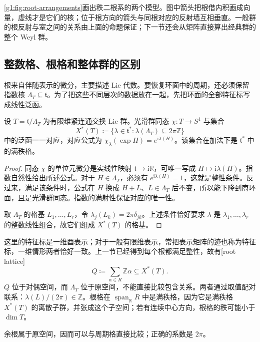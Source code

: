 \cref{g1:fig:root-arrangements}画出秩二根系的两个模型。图中箭头把根借内积画成向量，虚线才是它们的核；位于根方向的箭头与同根对应的反射墙互相垂直。一般群的根反射与室之间的关系由上面的命题保证；下一节还会从矩阵直接算出经典群的整个 Weyl 群。

\subsection{整数格、根格和整体群的区别}
\label{g1:subsec:1904:04}
根来自伴随表示的微分，主要描述 Lie 代数。要恢复环面中的周期，还必须保留指数核
\(\Lambda_T\subseteq\mathfrak t\)。为了把这些不同层次的数据放在一起，先把环面的全部特征标写成线性泛函。

\begin{proposition}\label{g1:prop:torus-character-lattice}
	设 \(T=\mathfrak t/\Lambda_T\) 为有限维紧连通交换 Lie 群。光滑群同态 \(\chi:T\to S^1\) 与集合
	\[
		X^*(T)\coloneqq\{\lambda\in\mathfrak t^*:
		\lambda(\Lambda_T)\subseteq2\pi\mathbb Z\}
	\]
	中的泛函一一对应，对应公式为 \(\chi_\lambda(\exp H)=e^{\mathrm{i}\lambda(H)}\)。该集合在加法下是 \(\mathfrak t^*\) 中的满秩格。
\end{proposition}
\begin{proof}
	同态 \(\chi\) 的单位元微分是实线性映射 \(\mathfrak t\to\mathrm{i}\mathbb R\)，可唯一写成 \(H\mapsto\mathrm{i}\lambda(H)\)。指数自然性给出所述公式。对于 \(H\in\Lambda_T\)，必须有 \(e^{\mathrm{i}\lambda(H)}=1\)，这就是整性条件。反过来，满足该条件时，公式在 \(H\) 换成 \(H+L\)、\(L\in\Lambda_T\) 后不变，所以能下降到商环面，且是光滑群同态。指数的满射性保证对应的唯一性。

	取 \(\Lambda_T\) 的格基 \(L_1,\ldots,L_r\)，令 \(\lambda_j(L_k)=2\pi\delta_{jk}\)。上述条件恰好要求 \(\lambda\) 是 \(\lambda_1,\ldots,\lambda_r\) 的整数线性组合，故它们组成 \(X^*(T)\) 的格基。
\end{proof}

这里的特征标是一维酉表示；对于一般有限维表示，常把表示矩阵的迹也称为特征标，一维情形两者恰好一致。上一节已经得到每个根都满足整性，故有[root lattice]
\[
	Q\coloneqq\sum_{\alpha\in R}\mathbb Z\alpha
	\subseteq X^*(T).
\]
\(Q\) 位于对偶空间，而 \(\Lambda_T\) 位于原空间，不能直接比较包含关系。两者通过取值配对联系：\(\lambda(L)/(2\pi)\in\mathbb Z\)。根格在 \(\operatorname{span}_{\mathbb R}R\) 中是满秩格，因为它是满秩格 \(X^*(T)\) 的离散子群，并张成这个子空间；若有连续中心方向，根格的秩可能小于 \(\dim T\)。

\ProseParagraphBreak
余根属于原空间，因而可以与周期格直接比较；正确的系数是 \(2\pi\)。

